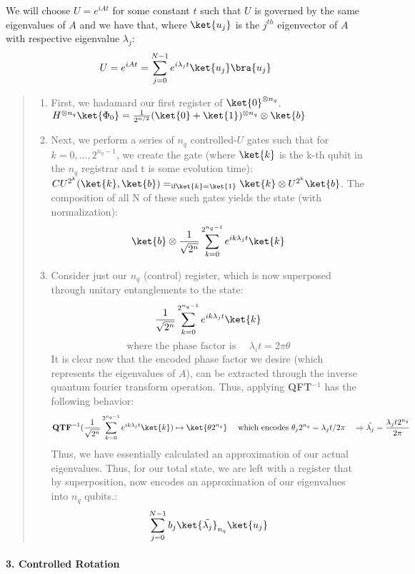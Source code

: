 \documentclass[11pt]{article}
\providecommand{\tightlist}{%
      \setlength{\itemsep}{0pt}\setlength{\parskip}{0pt}}
\begin{document}
We will choose \(U = e^{iAt}\) for some constant \(t\) such that \(U\)
is governed by the same eigenvalues of \(A\) and we have that, where
\(\ket{u_{j}}\) is the \(j^{th}\) eigenvector of \(A\) with respective
eigenvalue \(\lambda_{j}\):
\[U = e^{iAt} = \sum_{j=0}^{N-1}e^{i\lambda_{j}t}\ket{u_j}\bra{u_j}\]

\begin{quote}
\begin{enumerate}
\def\labelenumi{\arabic{enumi}.}
\tightlist
\item
  First, we hadamard our first register of \(\ket{0}^{\otimes n_q}\).
  \(H^{\otimes n_q}\ket{\Phi_0} = \frac{1}{2^{n/2}}(\ket{0} + \ket{1})^{\otimes n_q} \otimes \ket{b}\)
\item
  Next, we perform a series of \(n_q\) controlled-\(U\) gates such that
  for \(k = {0,...,2^{n_q-1}}\), we create the gate (where \(\ket{k}\)
  is the k-th qubit in the \(n_q\) registrar and t is some evolution
  time):
  \(CU^{2^k}(\ket{k}, \ket{b}) =_{\text{if} \ket{k}=\ket{1}} \ket{k} \otimes U^{2^k}\ket{b}\).
  The composition of all N of these such gates yields the state (with
  normalization):
  \[ \ket{b} \otimes \frac{1}{\sqrt{2^n}} \sum_{k=0}^{2^{n_q-1}} e^{i k \lambda_j t} \ket{k}\]
\item
  Consider just our \(n_q\) (control) register, which is now superposed
  through unitary entanglements to the state:
  \[ \frac{1}{\sqrt{2^n}} \sum_{k=0}^{2^{n_q-1}} e^{i k \lambda_j t} \ket{k} \]
  \[ \text{where the phase factor is }\quad \lambda_i t = 2\pi\theta \]
  It is clear now that the encoded phase factor we desire (which
  represents the eigenvalues of \(A\)), can be extracted through the
  inverse quantum fourier transform operation. Thus, applying
  \textbf{QFT\(^{-1}\)} has the following behavior:
  \[\textbf{QTF}^{-1}(\frac{1}{\sqrt{2^n}} \sum_{k=0}^{2^{n_q-1}} e^{i k \lambda_j t} \ket{k}) \mapsto \ket{\theta 2^{n_q}} \quad\text{ which encodes } \theta_j 2^{n_q} = \lambda_j t / 2\pi \quad\Rightarrow \tilde{\lambda_j} = \frac{\lambda_j t 2^{n_q}}{2\pi}\]
  Thus, we have essentially calculated an approximation of our actual
  eigenvalues. Thus, for our total state, we are left with a register
  that by superposition, now encodes an approximation of our eigenvalues
  into \(n_q\) qubits.:
  \[\sum_{j=0}^{N-1}b_{j}\ket{\tilde{\lambda_j}}_{n_q}\ket{u_j}\]
\end{enumerate}
\end{quote}

\paragraph{\texorpdfstring{\textbf{3. Controlled
Rotation}}{3. Controlled Rotation}}\label{controlled-rotation}
\end{document}
